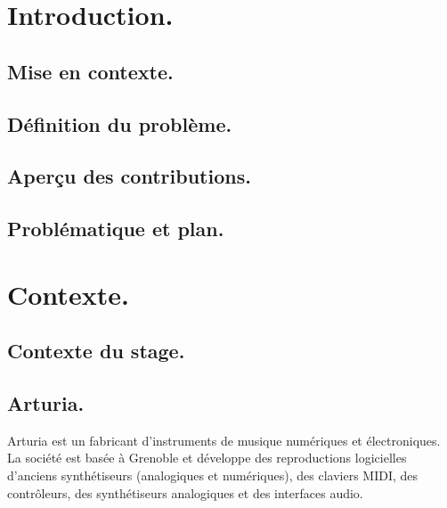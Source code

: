 \documentclass[francais]{rapportPFE}  %
\begin{document}

\setcounter{tocdepth}{3}
\tableofcontents
\cleardoublepage




     
     
     
\section{Introduction.}

\subsection{Mise en contexte.}
\subsection{Définition du problème.}
\subsection{Aperçu des contributions.}
\subsection{Problématique et plan.}



\section{Contexte.}

\subsection{Contexte du stage.}
\subsection{Arturia.}

Arturia est un fabricant d'instruments de musique numériques et électroniques. La société est basée à Grenoble et développe des reproductions logicielles d'anciens synthétiseurs (analogiques et numériques), des claviers MIDI, des contrôleurs, des synthétiseurs analogiques et des interfaces audio. 
\end{document}
